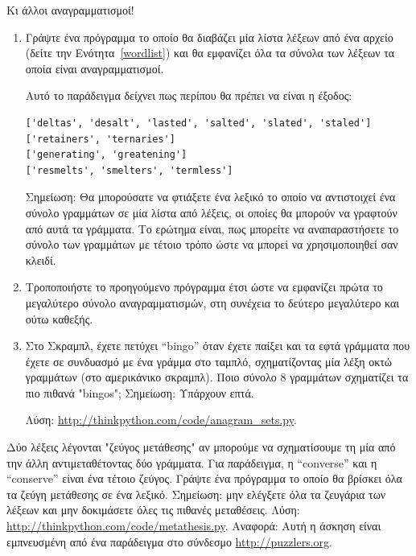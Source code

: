 \documentclass[10pt]{book}
\begin{document}
\begin{exercise}
\label{anagrams}

Κι άλλοι αναγραμματισμοί!

\begin{enumerate}

\item Γράψτε ένα πρόγραμμα το οποίο θα διαβάζει μία λίστα λέξεων από ένα αρχείο (δείτε την Ενότητα~\ref{wordlist}) και θα εμφανίζει όλα τα σύνολα των λέξεων τα οποία είναι αναγραμματισμοί.

Αυτό το παράδειγμα δείχνει πως περίπου θα πρέπει να είναι η έξοδος:

\begin{verbatim}
['deltas', 'desalt', 'lasted', 'salted', 'slated', 'staled']
['retainers', 'ternaries']
['generating', 'greatening']
['resmelts', 'smelters', 'termless']
\end{verbatim}
%
Σημείωση: Θα μπορούσατε να φτιάξετε ένα λεξικό το οποίο να αντιστοιχεί ένα σύνολο γραμμάτων σε μία λίστα από λέξεις, οι οποίες θα μπορούν να γραφτούν από αυτά τα γράμματα. Το ερώτημα είναι, πως μπορείτε να αναπαραστήσετε το σύνολο των γραμμάτων με τέτοιο τρόπο ώστε να μπορεί να χρησιμοποιηθεί σαν κλειδί.

\item Τροποποιήστε το προηγούμενο πρόγραμμα έτσι ώστε να εμφανίζει πρώτα το μεγαλύτερο σύνολο αναγραμματισμών, στη συνέχεια το δεύτερο μεγαλύτερο και ούτω καθεξής.

\item Στο Σκραμπλ, έχετε πετύχει ``bingo'' όταν έχετε παίξει και τα εφτά γράμματα που έχετε σε συνδυασμό με ένα γράμμα στο ταμπλό, σχηματίζοντας μία λέξη οκτώ γραμμάτων (στο αμερικάνικο σκραμπλ). Ποιο σύνολο 8 γραμμάτων σχηματίζει τα πιο πιθανά "bingos"; Σημείωση: Υπάρχουν επτά.


Λύση: \url{http://thinkpython.com/code/anagram_sets.py}.
\\
\end{enumerate}

\end{exercise}


\begin{exercise}

Δύο λέξεις λέγονται "ζεύγος μετάθεσης" αν μπορούμε να σχηματίσουμε τη μία από την άλλη αντιμεταθέτοντας δύο γράμματα. Για παράδειγμα, η ``converse''  και η  ``conserve'' είναι ένα τέτοιο ζεύγος. Γράψτε ένα πρόγραμμα το οποίο θα βρίσκει όλα τα ζεύγη μετάθεσης σε ένα λεξικό. Σημείωση: μην ελέγξετε όλα τα ζευγάρια των λέξεων και μην δοκιμάσετε όλες τις πιθανές μεταθέσεις. Λύση: \url{http://thinkpython.com/code/metathesis.py}. Αναφορά: Αυτή η άσκηση είναι εμπνευσμένη από ένα παράδειγμα στο σύνδεσμο \url{http://puzzlers.org}.
\\
\end{exercise}
\end{document}
